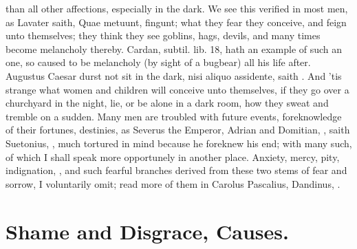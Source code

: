{{than all other affections, especially in the dark. We see this verified
in most men, as Lavater saith, Quae metuunt, fingunt; what they
fear they conceive, and feign unto themselves; they think they see
goblins, hags, devils, and many times become melancholy thereby.
Cardan, subtil. lib. 18, hath an example of such an one, so caused to
be melancholy (by sight of a bugbear) all his life after. Augustus
Caesar durst not sit in the dark, nisi aliquo assidente, saith
. And 'tis strange what
women and children will conceive unto themselves, if they go over a
churchyard in the night, lie, or be alone in a dark room, how they
sweat and tremble on a sudden. Many men are troubled with future
events, foreknowledge of their fortunes, destinies, as Severus the
Emperor, Adrian and Domitian, , saith
Suetonius, , much tortured in mind because he foreknew
his end; with many such, of which I shall speak more opportunely in
another place. Anxiety, mercy, pity, indignation, \etc{}, and such
fearful branches derived from these two stems of fear and sorrow, I
voluntarily omit; read more of them in Carolus Pascalius,
Dandinus, \etc{}.

\section{Shame and Disgrace, Causes.}

}}
